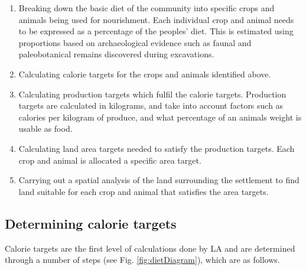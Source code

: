   \begin{enumerate} 
  \item Breaking down the basic diet of the community into specific crops and
  animals being used for nourishment.  Each individual crop and animal needs to
  be expressed as a percentage of the peoples' diet.  This is estimated using
  proportions based on archaeological evidence such as faunal and
  paleobotanical remains discovered during excavations.  
  
  \item Calculating calorie targets for the crops and animals identified above.
 
  \item Calculating production targets which fulfil the calorie targets.
  Production targets are calculated in kilograms, and take into account factors
  such as calories per kilogram of produce, and what percentage of an animals
  weight is usable as food.  
  
  \item Calculating land area targets needed to satisfy the production targets.
  Each crop and animal is allocated a specific area target.  
  
  \item Carrying out a spatial analysis of the land surrounding the settlement
  to find land suitable for each crop and animal that satisfies the area
  targets.
  \end{enumerate}

\subsection{Determining calorie targets}
  Calorie targets are the first level of calculations done by LA and are determined through a number of steps (see Fig.  \ref{fig:dietDiagram}), which are as follows.




